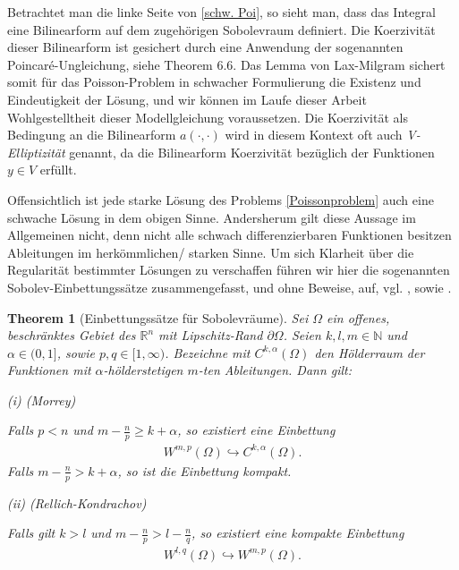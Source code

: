 \documentclass[bibliography=totoc,12pt,a4paper]{scrartcl}
\theoremstyle{exampstyle}
\newtheorem{theorem}[defi]{Theorem}
\numberwithin{equation}{section}
\begin{document}
Betrachtet man die linke Seite von \ref{schw. Poi}, so sieht man, dass das Integral eine Bilinearform auf dem zugehörigen Sobolevraum definiert. Die Koerzivität dieser Bilinearform ist gesichert durch eine Anwendung der sogenannten Poincaré-Ungleichung, siehe \cite{PDE3} Theorem 6.6.
Das Lemma von Lax-Milgram sichert somit für das Poisson-Problem in schwacher Formulierung die Existenz und Eindeutigkeit der Lösung, und wir können im Laufe dieser Arbeit Wohlgestelltheit dieser Modellgleichung voraussetzen. Die Koerzivität als Bedingung an die Bilinearform $a(\cdot, \cdot)$ wird in diesem Kontext oft auch \textit{V-Elliptizität} genannt, da die Bilinearform Koerzivität bezüglich der Funktionen $y\in V$ erfüllt.

Offensichtlich ist jede starke Lösung des Problems \ref{Poissonproblem} auch eine schwache Lösung in dem obigen Sinne. Andersherum gilt diese Aussage im Allgemeinen nicht, denn nicht alle schwach differenzierbaren Funktionen besitzen Ableitungen im herkömmlichen/ starken Sinne. Um sich Klarheit über die Regularität bestimmter Lösungen zu verschaffen führen wir hier die sogenannten Sobolev-Einbettungssätze zusammengefasst, und ohne Beweise, auf, vgl. \cite{PDE3}, sowie \cite{brokenSobolev}.

\begin{theorem}[Einbettungssätze für Sobolevräume]\label{Embeddings}
Sei $\Omega$ ein offenes, beschränktes Gebiet des $\mathbb{R}^n$ mit Lipschitz-Rand $\partial\Omega$. Seien $k,l, m\in \mathbb{N}$ und $\alpha \in (0,1]$, sowie $p,q \in [1,\infty)$. Bezeichne mit $C^{k,\alpha}(\Omega)$ den Hölderraum der Funktionen mit $\alpha$-hölderstetigen $m$-ten Ableitungen. Dann gilt:

(i) (\textit{Morrey})

Falls $p < n$ und $m - \frac{n}{p} \geq k + \alpha$, so existiert eine Einbettung
\begin{align*}
	W^{m, p}(\Omega) \hookrightarrow C^{k, \alpha}(\Omega).
\end{align*}
Falls $m - \frac{n}{p} > k + \alpha$, so ist die Einbettung kompakt.

(ii) (\textit{Rellich-Kondrachov})

Falls gilt $k > l$ und $m - \frac{n}{p} > l - \frac{n}{q}$, so existiert eine kompakte Einbettung
\begin{align*}
	W^{l, q}(\Omega) \hookrightarrow 	W^{m, p}(\Omega).
\end{align*}
\end{theorem}
\end{document}
